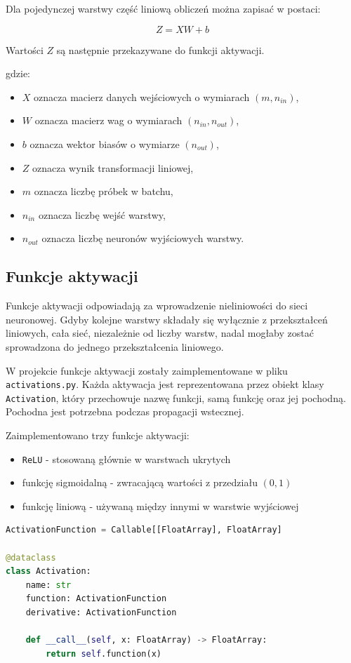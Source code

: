 Dla pojedynczej warstwy część liniową obliczeń można zapisać w postaci:

\[
    Z = XW + b
\]

Wartości \(Z\) są następnie przekazywane do funkcji aktywacji.

gdzie:
\begin{itemize}
    \item \(X\) oznacza macierz danych wejściowych o wymiarach
    \((m, n_{in})\),
    \item \(W\) oznacza macierz wag o wymiarach
    \((n_{in}, n_{out})\),
    \item \(b\) oznacza wektor biasów o wymiarze \((n_{out})\),
    \item \(Z\) oznacza wynik transformacji liniowej,
    \item \(m\) oznacza liczbę próbek w batchu,
    \item \(n_{in}\) oznacza liczbę wejść warstwy,
    \item \(n_{out}\) oznacza liczbę neuronów wyjściowych warstwy.
\end{itemize}

\subsection{Funkcje aktywacji}

Funkcje aktywacji odpowiadają za wprowadzenie nieliniowości do sieci
neuronowej. Gdyby kolejne warstwy składały się wyłącznie z przekształceń
liniowych, cała sieć, niezależnie od liczby warstw, nadal mogłaby zostać
sprowadzona do jednego przekształcenia liniowego.

W projekcie funkcje aktywacji zostały zaimplementowane w pliku
\texttt{activations.py}. Każda aktywacja jest reprezentowana przez obiekt
klasy \texttt{Activation}, który przechowuje nazwę funkcji, samą funkcję oraz
jej pochodną. Pochodna jest potrzebna podczas propagacji wstecznej.

Zaimplementowano trzy funkcje aktywacji:
\begin{itemize}
    \item \texttt{ReLU} - stosowaną głównie w warstwach ukrytych
    \item funkcję sigmoidalną - zwracającą wartości z przedziału \((0, 1)\)
    \item funkcję liniową - używaną między innymi w warstwie wyjściowej
\end{itemize}

\begin{lstlisting}[language=Python, caption={Fragment implementacji klasy reprezentującej funkcję aktywacji.}, label={lst:activations}, basicstyle=\ttfamily\small, breaklines=true, frame=single]
ActivationFunction = Callable[[FloatArray], FloatArray]

@dataclass
class Activation:
    name: str
    function: ActivationFunction
    derivative: ActivationFunction

    def __call__(self, x: FloatArray) -> FloatArray:
        return self.function(x)
\end{lstlisting}


